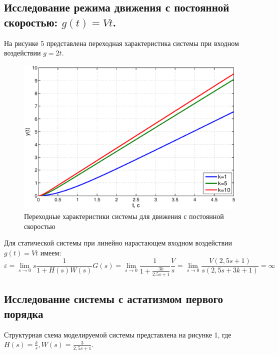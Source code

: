 \documentclass[12pt,a4paper]{article}
\begin{document}
\subsection{Исследование режима движения с постоянной скоростью: $g(t)=Vt$.} 
На рисунке 5 представлена переходная характеристика системы при входном воздействии $g=2t$.
\begin{figure}[H]
	\centering
	\includegraphics[width=1\linewidth]{1.2.eps}
	\caption{Переходные характеристики системы для движения с постоянной скоростью}
\end{figure}
Для статической системы при линейно нарастающем входном воздействии $g(t)=Vt$ имеем:
\begin{equation}
    \varepsilon = \lim_{s\to0} s\frac{1}{1+H(s)W(s)}G(s) = \lim_{s\to0} \frac{1}{1+\displaystyle{\frac{3k}{2.5s+1}}}\frac{V}{s} = \lim_{s\to0} \frac{V(2,5s+1)}{s(2,5s+3k+1)} = \infty
\end{equation}

\newpage
\begin{center}
\section{Исследование системы с астатизмом первого порядка}
\end{center}
Структурная схема моделируемой системы представлена на рисунке 1, где $H(s) = \displaystyle{\frac{k}{s}}, W(s)=\displaystyle{\frac{3}{2,5s + 1}}$.
\end{document}
